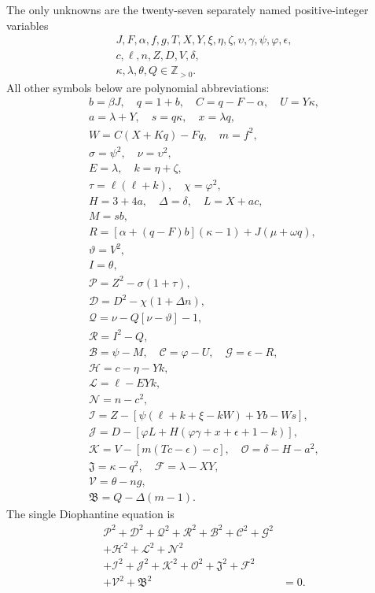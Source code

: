 The only unknowns are the twenty-seven separately named positive-integer variables
\[
\begin{gathered}J,F,\alpha,f,g,T,X,Y,\xi,\eta,\zeta,\upsilon,\gamma,\psi,\varphi,\epsilon,\\
c,\ell,n,Z,D,V,\delta,\\
\kappa,\lambda,\theta,Q\in\mathbb Z_{>0}.\end{gathered}
\]
All other symbols below are polynomial abbreviations:
\[
\begin{gathered}
b=\beta J,\quad q=1+b,\quad C=q-F-\alpha,\quad U=Y\kappa,\\
a=\lambda+Y,\quad s=q\kappa,\quad x=\lambda q,\\
W=C(X+Kq)-Fq,\quad m=f^2,\\
\sigma=\psi^2,\quad\nu=\upsilon^2,\\
E=\lambda,\quad k=\eta+\zeta,\\
\tau=\ell(\ell+k),\quad\chi=\varphi^2,\\
H=3+4a,\quad\Delta=\delta,\quad L=X+ac,\\
M=sb,\\
R=[\alpha+(q-F)b](\kappa-1)+J(\mu+\omega q),\\
\vartheta=V^2,\\
I=\theta,\\
\mathcal{P}=Z^2-\sigma(1+\tau),\\
\mathcal{D}=D^2-\chi(1+\Delta n),\\
\mathcal{Q}=\nu-Q[\nu-\vartheta]-1,\\
\mathcal{R}=I^2-Q,\\
\mathcal{B}=\psi-M,\quad \mathcal{C}=\varphi-U,\quad \mathcal{G}=\epsilon-R,\\
\mathcal{H}=c-\eta-Yk,\\
\mathcal{L}=\ell-EYk,\\
\mathcal{N}=n-c^2,\\
\mathcal{I}=Z-[\psi(\ell+k+\xi-kW)+Yb-Ws],\\
\mathcal{J}=D-[\varphi L+H(\varphi\gamma+x+\epsilon+1-k)],\\
\mathcal{K}=V-[m(Tc-\epsilon)-c],\quad\mathcal{O}=\delta-H-a^2,\\
\mathfrak{J}=\kappa-q^2,\quad\mathcal{F}=\lambda-XY,\\
\mathcal{V}=\theta-ng,\\
\mathfrak{B}=Q-\Delta(m-1).
\end{gathered}
\]
The single Diophantine equation is
\[
\begin{split}
\mathcal{P}^2+\mathcal{D}^2+\mathcal{Q}^2+\mathcal{R}^2+\mathcal{B}^2+\mathcal{C}^2+\mathcal{G}^2 &\\
+\mathcal{H}^2+\mathcal{L}^2+\mathcal{N}^2 &\\
+\mathcal{I}^2+\mathcal{J}^2+\mathcal{K}^2+\mathcal{O}^2+\mathfrak{J}^2+\mathcal{F}^2 &\\
+\mathcal{V}^2+\mathfrak{B}^2 &= 0.
\end{split}
\]
